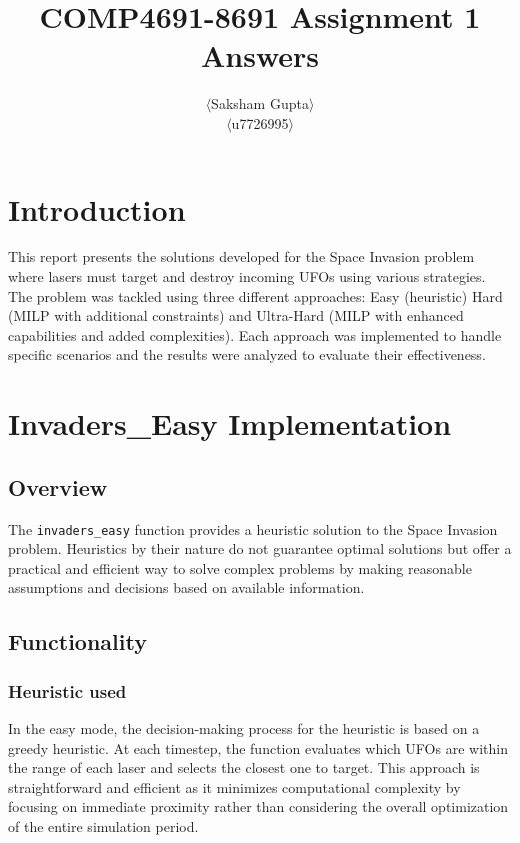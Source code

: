 \documentclass[12pt]{article}
\begin{document}
 
\title{COMP4691-8691 Assignment 1 Answers}
\author{$\langle$Saksham Gupta$\rangle$\\
$\langle$u7726995$\rangle$
}
\date{}

\maketitle

\section{Introduction}
This report presents the solutions developed for the Space Invasion problem where lasers must target and destroy incoming UFOs using various strategies. The problem was tackled using three different approaches: Easy (heuristic) Hard (MILP with additional constraints) and Ultra-Hard (MILP with enhanced capabilities and added complexities). Each approach was implemented to handle specific scenarios and the results were analyzed to evaluate their effectiveness.

\section{Invaders\_Easy Implementation}
\subsection{Overview}
The \texttt{invaders\_easy} function provides a heuristic solution to the Space Invasion problem. Heuristics by their nature do not guarantee optimal solutions but offer a practical and efficient way to solve complex problems by making reasonable assumptions and decisions based on available information.

\subsection{Functionality}
\subsubsection{Heuristic used}
In the easy mode, the decision-making process for the heuristic is based on a greedy heuristic. At each timestep, the function evaluates which UFOs are within the range of each laser and selects the closest one to target. This approach is straightforward and efficient as it minimizes computational complexity by focusing on immediate proximity rather than considering the overall optimization of the entire simulation period.
\end{document}
